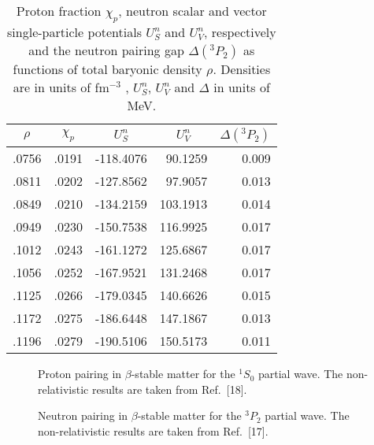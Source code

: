 \begin{table}
\caption{Proton fraction $\chi_p$, neutron scalar and vector
single-particle potentials
$U_S^n$ and $U_V^n$, respectively and
the neutron  pairing gap $\Delta( ^3P_2)$
as functions of total baryonic density $\rho$. 
Densities are in units
of fm$^{-3}$ , $U_S^n$, $U_V^n$ and
$\Delta$ in units of MeV.}
\begin{tabular}{rrrrr}
\multicolumn{1}{c}{$\rho$}&
\multicolumn{1}{c}{$\chi_p$}&
\multicolumn{1}{c}{$U_S^n$}&
\multicolumn{1}{c}{$U_V^n$}&
\multicolumn{1}{c}{$\Delta( ^3P_2)$}\\ \hline
 .0756  & .0191 & -118.4076  &  90.1259 & 0.009 \\
 .0811  & .0202 & -127.8562  &  97.9057 & 0.013 \\
 .0849  & .0210 & -134.2159  & 103.1913 & 0.014 \\
 .0949  & .0230 & -150.7538  & 116.9925 & 0.017 \\
 .1012  & .0243 & -161.1272  & 125.6867 & 0.017 \\
 .1056  & .0252 & -167.9521  & 131.2468 & 0.017 \\
 .1125  & .0266 & -179.0345  & 140.6626 & 0.015 \\
 .1172  & .0275 & -186.6448  & 147.1867 & 0.013 \\
 .1196  & .0279 & -190.5106  & 150.5173 & 0.011 \\
\end{tabular}
\label{tab:tab2}
\end{table}

\begin{figure}[htbp]
\caption{Proton pairing in $\beta$-stable matter for 
the $^1S_0$ partial wave. The non-relativistic results are taken from
Ref.\ [18].}
\label{fig:fig1}
\end{figure}

\begin{figure}[htbp]
\caption{Neutron pairing in $\beta$-stable matter 
for the $^3P_2$
partial wave. The non-relativistic results are taken from Ref.\ [17].}
\label{fig:fig2}
\end{figure}
















